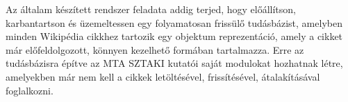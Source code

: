 Az általam készített rendszer feladata addig terjed, hogy előállítson, karbantartson és üzemeltessen egy folyamatosan frissülő tudásbázist, amelyben minden Wikipédia cikkhez tartozik egy objektum reprezentáció, amely a cikket már előfeldolgozott, könnyen kezelhető formában tartalmazza. Erre az tudásbázisra építve az MTA SZTAKI kutatói saját modulokat hozhatnak létre, amelyekben már nem kell a cikkek letöltésével, frissítésével, átalakításával foglalkozni.

